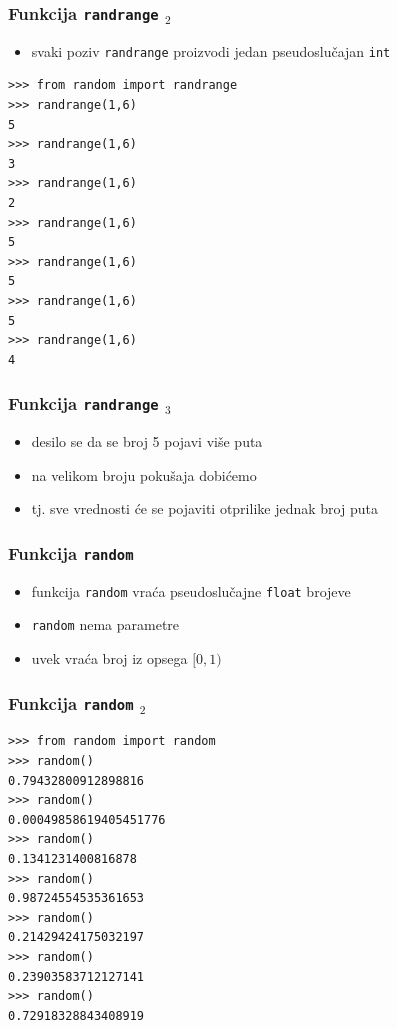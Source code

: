 \documentclass[utf8,compress]{beamer}
\begin{document}
\begin{frame}[fragile,shrink=5]
  \frametitle{Funkcija \texttt{randrange} $_2$}
  \begin{itemize}
    \item svaki poziv \texttt{randrange} proizvodi jedan pseudoslučajan \texttt{int}
  \end{itemize}
\begin{verbatim}
>>> from random import randrange
>>> randrange(1,6)
5
>>> randrange(1,6)
3
>>> randrange(1,6)
2
>>> randrange(1,6)
5
>>> randrange(1,6)
5
>>> randrange(1,6)
5
>>> randrange(1,6)
4
\end{verbatim}
\end{frame}

\begin{frame}
  \frametitle{Funkcija \texttt{randrange} $_3$}
  \begin{itemize}
    \item desilo se da se broj 5 pojavi više puta
    \item na velikom broju pokušaja dobićemo 
    \item tj. sve vrednosti će se pojaviti otprilike jednak broj puta
  \end{itemize}
\end{frame}

\begin{frame}
  \frametitle{Funkcija \texttt{random}}
  \begin{itemize}
    \item funkcija \texttt{random} vraća pseudoslučajne \texttt{float} brojeve
    \item \texttt{random} nema parametre
    \item uvek vraća broj iz opsega $[0,1)$
  \end{itemize}
\end{frame}

\begin{frame}[fragile]
  \frametitle{Funkcija \texttt{random} $_2$}
\begin{verbatim}
>>> from random import random
>>> random()
0.79432800912898816
>>> random()
0.00049858619405451776
>>> random()
0.1341231400816878
>>> random()
0.98724554535361653
>>> random()
0.21429424175032197
>>> random()
0.23903583712127141
>>> random()
0.72918328843408919
\end{verbatim}
\end{frame}
\end{document}
